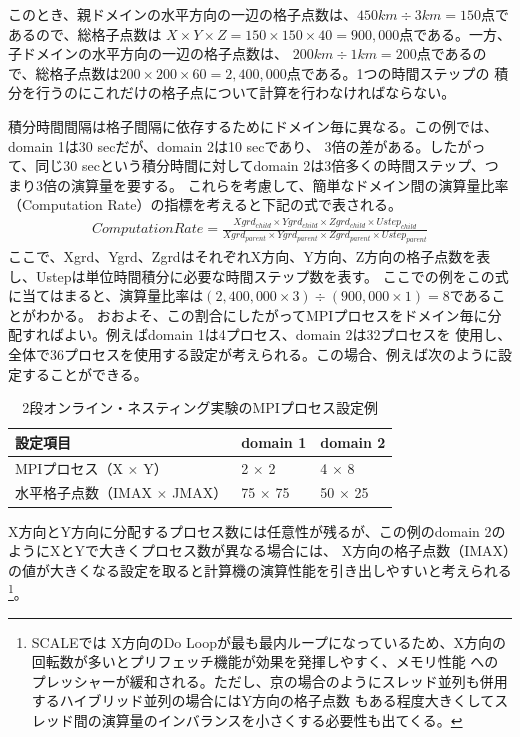 このとき、親ドメインの水平方向の一辺の格子点数は、$450 km \div 3 km = 150$点であるので、総格子点数は
$X \times Y \times Z = 150 \times 150 \times 40 = 900,000$点である。一方、子ドメインの水平方向の一辺の格子点数は、
$200 km \div 1 km = 200$点であるので、総格子点数は$200 \times 200 \times 60 = 2,400,000$点である。1つの時間ステップの
積分を行うのにこれだけの格子点について計算を行わなければならない。

積分時間間隔は格子間隔に依存するためにドメイン毎に異なる。この例では、domain 1は30 secだが、domain 2は10 secであり、
3倍の差がある。したがって、同じ30 secという積分時間に対してdomain 2は3倍多くの時間ステップ、つまり3倍の演算量を要する。
これらを考慮して、簡単なドメイン間の演算量比率（Computation Rate）の指標を考えると下記の式で表される。
\begin{eqnarray}
ComputationRate=\frac{Xgrd_{child} \times Ygrd_{child} \times Zgrd_{child} \times Ustep_{child}}
                     {Xgrd_{parent} \times Ygrd_{parent} \times Zgrd_{parent} \times Ustep_{parent}} \nonumber
\end{eqnarray}
ここで、Xgrd、Ygrd、ZgrdはそれぞれX方向、Y方向、Z方向の格子点数を表し、Ustepは単位時間積分に必要な時間ステップ数を表す。
ここでの例をこの式に当てはまると、演算量比率は$(2,400,000 \times 3) \div (900,000 \times 1) = 8$であることがわかる。
おおよそ、この割合にしたがってMPIプロセスをドメイン毎に分配すればよい。例えばdomain 1は4プロセス、domain 2は32プロセスを
使用し、全体で36プロセスを使用する設定が考えられる。この場合、例えば次のように設定することができる。

\begin{table}[htb]
\begin{center}
\caption{2段オンライン・ネスティング実験のMPIプロセス設定例}
\begin{tabularx}{150mm}{|l|l|X|} \hline
 \rowcolor[gray]{0.9} 設定項目 & domain 1 & domain 2 \\ \hline
 MPIプロセス（X $\times$ Y） & 2 $\times$ 2 & 4 $\times$ 8 \\ \hline
 水平格子点数（IMAX $\times$ JMAX） & 75 $\times$ 75 & 50 $\times$ 25 \\ \hline
\end{tabularx}
\label{tab:nest_proc_guide2}
\end{center}
\end{table}

X方向とY方向に分配するプロセス数には任意性が残るが、この例のdomain 2のようにXとYで大きくプロセス数が異なる場合には、
X方向の格子点数（IMAX）の値が大きくなる設定を取ると計算機の演算性能を引き出しやすいと考えられる\footnote{SCALEでは
X方向のDo Loopが最も最内ループになっているため、X方向の回転数が多いとプリフェッチ機能が効果を発揮しやすく、メモリ性能
へのプレッシャーが緩和される。ただし、京の場合のようにスレッド並列も併用するハイブリッド並列の場合にはY方向の格子点数
もある程度大きくしてスレッド間の演算量のインバランスを小さくする必要性も出てくる。}。

